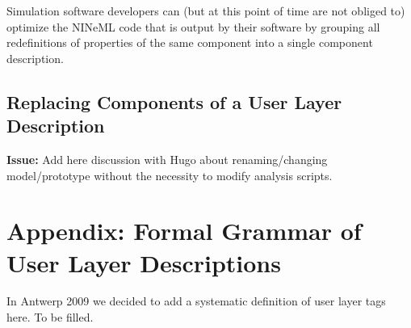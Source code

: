 \documentclass{article}
\newcommand{\issue}[1]{%
\begin{center}
\colorbox{issuecolor}{\parbox{0.8\linewidth}{\textbf{Issue:} #1}}
\end{center}%
}
\begin{document}
Simulation software developers can (but at this
point of time are not obliged to) optimize the NINeML code that is
output by their software by grouping all redefinitions of properties of
the same component into a single component description.

\subsection{Replacing Components of a User Layer Description}

\issue{Add here discussion with Hugo about renaming/changing model/prototype
without the necessity to modify analysis scripts.}

\section{Appendix: Formal Grammar of User Layer Descriptions}

In Antwerp 2009 we decided to add a systematic definition of user layer tags here.
To be filled.



\end{document}
